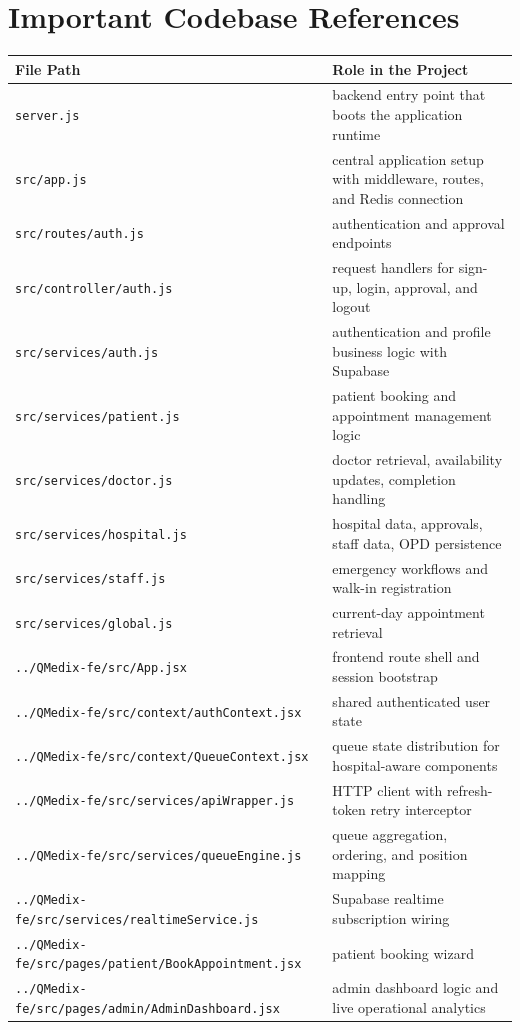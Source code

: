\documentclass[12pt,onecolumn]{IEEEtran}
\let\oldsection\section
\renewcommand{\section}{\clearpage\oldsection}
\begin{document}
\section{Important Codebase References}
\begin{tabularx}{\textwidth}{l X}
\toprule
\textbf{File Path} & \textbf{Role in the Project} \\
\midrule
\texttt{server.js} & backend entry point that boots the application runtime \\
\texttt{src/app.js} & central application setup with middleware, routes, and Redis connection \\
\texttt{src/routes/auth.js} & authentication and approval endpoints \\
\texttt{src/controller/auth.js} & request handlers for sign-up, login, approval, and logout \\
\texttt{src/services/auth.js} & authentication and profile business logic with Supabase \\
\texttt{src/services/patient.js} & patient booking and appointment management logic \\
\texttt{src/services/doctor.js} & doctor retrieval, availability updates, completion handling \\
\texttt{src/services/hospital.js} & hospital data, approvals, staff data, OPD persistence \\
\texttt{src/services/staff.js} & emergency workflows and walk-in registration \\
\texttt{src/services/global.js} & current-day appointment retrieval \\
\texttt{../QMedix-fe/src/App.jsx} & frontend route shell and session bootstrap \\
\texttt{../QMedix-fe/src/context/authContext.jsx} & shared authenticated user state \\
\texttt{../QMedix-fe/src/context/QueueContext.jsx} & queue state distribution for hospital-aware components \\
\texttt{../QMedix-fe/src/services/apiWrapper.js} & HTTP client with refresh-token retry interceptor \\
\texttt{../QMedix-fe/src/services/queueEngine.js} & queue aggregation, ordering, and position mapping \\
\texttt{../QMedix-fe/src/services/realtimeService.js} & Supabase realtime subscription wiring \\
\texttt{../QMedix-fe/src/pages/patient/BookAppointment.jsx} & patient booking wizard \\
\texttt{../QMedix-fe/src/pages/admin/AdminDashboard.jsx} & admin dashboard logic and live operational analytics \\
\bottomrule
\end{tabularx}
\end{document}
